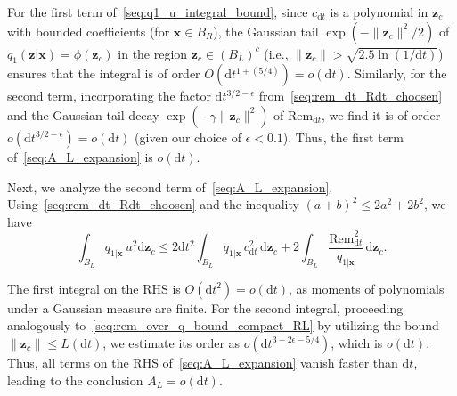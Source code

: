 For the first term of~\eqref{seq:q1_u_integral_bound}, since $c_{\mathrm dt}$ is a polynomial in $\bm z_c$ with bounded coefficients (for $\bm x\in B_R$), the Gaussian tail $\exp(-\|\bm z_c\|^2/2)$ of $q_1(\bm z|\bm x)=\phi(\bm z_c)$ in the region $\bm z_c\in (B_L)^c$ (i.e., $\|\bm z_c\|>\sqrt{2.5\ln(1/\mathrm dt)}$) ensures that the integral is of order $O(\mathrm dt^{1+(5/4)})=o(\mathrm dt)$. Similarly, for the second term, incorporating the factor $\mathrm dt^{3/2-\epsilon}$ from~\eqref{seq:rem_dt_Rdt_choosen} and the Gaussian tail decay $\exp(-\gamma\|\bm z_c\|^2)$ of $\mathrm{Rem}_{\mathrm dt}$, we find it is of order $o(\mathrm dt^{3/2-\epsilon})=o(\mathrm dt)$ (given our choice of $\epsilon<0.1$). Thus, the first term of~\eqref{seq:A_L_expansion} is $o(\mathrm dt)$.

Next, we analyze the second term of~\eqref{seq:A_L_expansion}. Using~\eqref{seq:rem_dt_Rdt_choosen} and the inequality $(a+b)^2\leq2a^2+2b^2$, we have
\begin{equation*}
    \int_{B_L}q_{1|\bm x}\,u^2\mathrm d\bm z_c
    \leq2\mathrm dt^2\!\int_{B_L}q_{1|\bm x}\,c_{\mathrm dt}^2\,\mathrm d\bm z_c
    +2\int_{B_L}\frac{\mathrm{Rem}_{\mathrm dt}^2}{q_{1|\bm x}}\,\mathrm d\bm z_c.
\end{equation*}

The first integral on the RHS is $O(\mathrm dt^2)=o(\mathrm dt)$, as moments of polynomials under a Gaussian measure are finite. For the second integral, proceeding analogously to~\eqref{seq:rem_over_q_bound_compact_RL} by utilizing the bound $\|\bm z_c\|\leq L(\mathrm dt)$, we estimate its order as $o(\mathrm dt^{3-2\epsilon-5/4})$, which is $o(\mathrm dt)$. Thus, all terms on the RHS of~\eqref{seq:A_L_expansion} vanish faster than $\mathrm dt$, leading to the conclusion $A_L=o(\mathrm dt)$.

